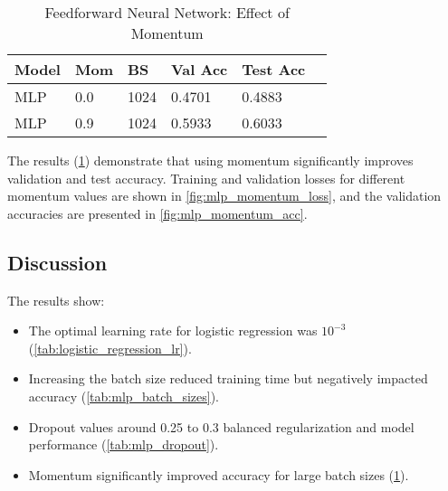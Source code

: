 \begin{table}[h]
\centering
\caption{Feedforward Neural Network: Effect of Momentum}
\label{tab:mlp_momentum}
\begin{tabularx}{\columnwidth}{|X|X|X|X|X|X|}
\hline
\textbf{Model} & \textbf{Mom} & \textbf{BS} & \textbf{Val Acc} & \textbf{Test Acc} \\ \hline
MLP & 0.0 & 1024 & 0.4701 & 0.4883 \\ \hline
MLP & 0.9 & 1024 & 0.5933 & 0.6033 \\ \hline
\end{tabularx}
\end{table}

The results (\cref{tab:mlp_momentum}) demonstrate that using momentum significantly improves validation and test accuracy. Training and validation losses for different momentum values are shown in \cref{fig:mlp_momentum_loss}, and the validation accuracies are presented in \cref{fig:mlp_momentum_acc}.

\subsection{Discussion}
The results show:
\begin{itemize}
    \item The optimal learning rate for logistic regression was $10^{-3}$ (\cref{tab:logistic_regression_lr}).
    \item Increasing the batch size reduced training time but negatively impacted accuracy (\cref{tab:mlp_batch_sizes}).
    \item Dropout values around 0.25 to 0.3 balanced regularization and model performance (\cref{tab:mlp_dropout}).
    \item Momentum significantly improved accuracy for large batch sizes (\cref{tab:mlp_momentum}).
\end{itemize}